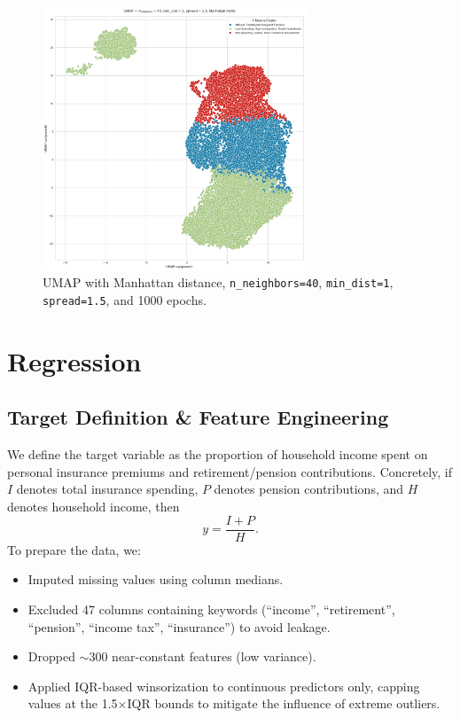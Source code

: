 \documentclass{article}
\begin{document}
\begin{figure}[H]
    \centering
    \includegraphics[width=0.7\textwidth]{figures/output3.png}
    \caption{UMAP with Manhattan distance, \texttt{n\_neighbors=40}, \texttt{min\_dist=1}, \texttt{spread=1.5}, and 1000 epochs.}
    \label{fig:umap_final}
\end{figure}


\section{Regression}
\subsection*{Target Definition \& Feature Engineering}
We define the target variable as the proportion of household income spent on personal insurance premiums and retirement/pension contributions. Concretely, if $I$ denotes total insurance spending, $P$ denotes pension contributions, and $H$ denotes household income, then
\[
  y = \frac{I + P}{H}.
\]
To prepare the data, we:
\begin{itemize}
  \item Imputed missing values using column medians.
  \item Excluded 47 columns containing keywords (``income'', ``retirement'', ``pension'', ``income tax'', ``insurance'') to avoid leakage.
  \item Dropped $\sim$300 near-constant features (low variance).
  \item Applied IQR-based winsorization to continuous predictors only, capping values at the 1.5\(\times\)IQR bounds to mitigate the influence of extreme outliers.
\end{itemize}
\end{document}

